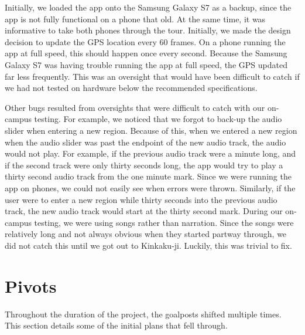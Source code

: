 \documentclass[a4paper, 10pt, american, titlepage]{article}
\begin{document}
Initially, we loaded the app onto the Samsung Galaxy S7 as a backup, since the
app is not fully functional on a phone that old. At the same time, it was
informative to take both phones through the tour. Initially, we made the design
decision to update the GPS location every 60 frames. On a phone running the app
at full speed, this should happen once every second. Because the Samsung Galaxy
S7 was having trouble running the app at full speed, the GPS updated far less
frequently. This was an oversight that would have been difficult to catch if we
had not tested on hardware below the recommended specifications.

Other bugs resulted from oversights that were difficult to catch with our
on-campus testing.  For example, we noticed that we forgot to back-up the audio
slider when entering a new region.  Because of this, when we entered a new
region when the audio slider was past the endpoint of the new audio track, the
audio would not play. For example, if the previous audio track were a minute
long, and if the second track were only thirty seconds long, the app would try
to play a thirty second audio track from the one minute mark. Since we were
running the app on phones, we could not easily see when errors were thrown.
Similarly, if the user were to enter a new region while thirty seconds into the
previous audio track, the new audio track would start at the thirty second
mark. During our on-campus testing, we were using songs rather than narration.
Since the songs were relatively long and not always obvious when they started
partway through, we did not catch this until we got out to Kinkaku-ji. Luckily,
this was trivial to fix.


\newpage

\section{Pivots}
\label{sec:pivots}

Throughout the duration of the project, the goalposts shifted multiple times.
This section details some of the initial plans that fell through.

\newpage
\end{document}
